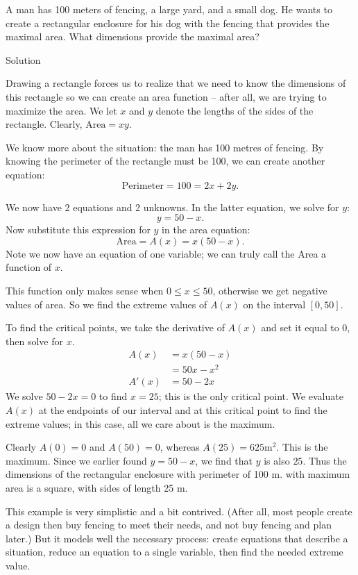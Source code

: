 \begin{example}
\label{ex_opt1}
A man has 100 meters of fencing, a large yard, and a small dog. He wants to create a rectangular enclosure for his dog with the fencing that provides the maximal area. What dimensions provide the maximal area?

Solution 

Drawing a rectangle forces us to realize that we need to know the dimensions of this rectangle so we can create an area function -- after all, we are trying to maximize the area. We let $x$ and $y$ denote the lengths of the sides of the rectangle. Clearly, $\text{Area}=xy.$

 We know more about the situation: the man has 100 metres of fencing. By knowing the perimeter of the rectangle must be 100, we can create another equation: $$\text{Perimeter} = 100 = 2x+2y.$$

We now have 2 equations and 2 unknowns. In the latter equation, we solve for $y$:
$$y = 50-x.$$ Now substitute this expression for $y$ in the area equation:
$$ \text{Area} = A(x) = x(50-x).$$ Note we now have an equation of one variable; we can truly call the Area a function of $x$. 

This function only makes sense when $0\leq x \leq 50$, otherwise we get negative values of area. So we find the extreme values of $A(x)$ on the interval $[0,50]$. 

To find the critical points, we take the derivative of $A(x)$ and set it equal to 0, then solve for $x$.
\begin{align*}
A(x) &= x(50-x) \\
			&= 50x-x^2 \\
A'(x) 	&= 50-2x
\end{align*}
We solve $50-2x=0$ to find $x=25$; this is the only critical point. We evaluate $A(x)$ at the endpoints of our interval and at this critical point to find the extreme values; in this case, all we care about is the maximum.

Clearly $A(0)=0$ and $A(50)=0$, whereas $A(25) = 625 \text{m}^2$. This is the maximum. Since we earlier found $y = 50-x$, we find that $y$ is also $25$. Thus the dimensions of the rectangular enclosure with perimeter of 100 m. with maximum area is a square, with sides of length 25 m.
\end{example}

This example is very simplistic and a bit contrived. (After all, most people create a design then buy fencing to meet their needs, and not buy fencing and plan later.) But it models well the necessary process: create equations that describe a situation, reduce an equation to a single variable, then find the needed extreme value.

